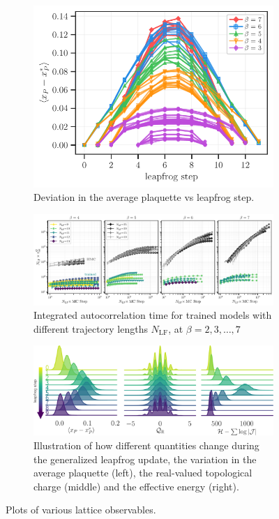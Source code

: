 \documentclass[a4paper,11pt]{article}
\begin{document}
\begin{figure}[htpb]
\begin{subfigure}[b]{0.49\textwidth}
        \includegraphics[width=\textwidth]{assets/plaqsf_leapfrog.pdf}
        \caption{\label{fig:plaqsf_beta}Deviation in the average plaquette vs
        leapfrog step.}
    \end{subfigure}
    \begin{subfigure}[b]{\textwidth}
        \includegraphics[width=\textwidth]{assets/tint.pdf}
        \caption{\label{fig:tint}Integrated autocorrelation time for trained
        models with different trajectory lengths \(N_{\mathrm{LF}}\), at
    \(\beta = 2, 3, \ldots, 7\)}
    \end{subfigure}
    \begin{subfigure}[t]{\textwidth}
        \includegraphics[width=\textwidth]{assets/ridgeplots.pdf}
        \caption{\label{fig:ridgeplots}Illustration of how different quantities
            change during the generalized leapfrog update, the variation in the
            average plaquette (left), the real-valued topological charge
        (middle) and the effective energy (right).}
    \end{subfigure}
    \caption{\label{fig:observables}Plots of various lattice observables.}
\end{figure}
\end{document}
